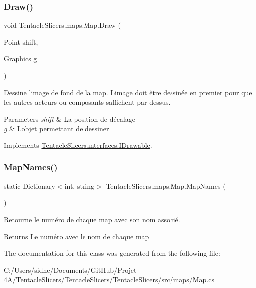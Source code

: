 \subsubsection{\texorpdfstring{Draw()}{Draw()}}
{\footnotesize\ttfamily void Tentacle\+Slicers.\+maps.\+Map.\+Draw (\begin{DoxyParamCaption}\item[{Point}]{shift,  }\item[{Graphics}]{g }\end{DoxyParamCaption})}



Dessine l\textquotesingle{}image de fond de la map. L\textquotesingle{}image doit être dessinée en premier pour que les autres acteurs ou composants s\textquotesingle{}affichent par dessus. 


\begin{DoxyParams}{Parameters}
{\em shift} & La position de décalage \\
\hline
{\em g} & L\textquotesingle{}objet permettant de dessiner \\
\hline
\end{DoxyParams}


Implements \hyperlink{interface_tentacle_slicers_1_1interfaces_1_1_i_drawable}{Tentacle\+Slicers.\+interfaces.\+I\+Drawable}.

\mbox{\label{class_tentacle_slicers_1_1maps_1_1_map_a2d27d0e714bd8f4874281cbed81af861}} 
\subsubsection{\texorpdfstring{Map\+Names()}{MapNames()}}
{\footnotesize\ttfamily static Dictionary$<$int, string$>$ Tentacle\+Slicers.\+maps.\+Map.\+Map\+Names (\begin{DoxyParamCaption}{ }\end{DoxyParamCaption})\hspace{0.3cm}{\ttfamily [static]}}



Retourne le numéro de chaque map avec son nom associé. 

\begin{DoxyReturn}{Returns}
Le numéro avec le nom de chaque map 
\end{DoxyReturn}


The documentation for this class was generated from the following file\+:\begin{DoxyCompactItemize}
\item 
C\+:/\+Users/sidne/\+Documents/\+Git\+Hub/\+Projet 4\+A/\+Tentacle\+Slicers/\+Tentacle\+Slicers/\+Tentacle\+Slicers/src/maps/Map.\+cs\end{DoxyCompactItemize}

